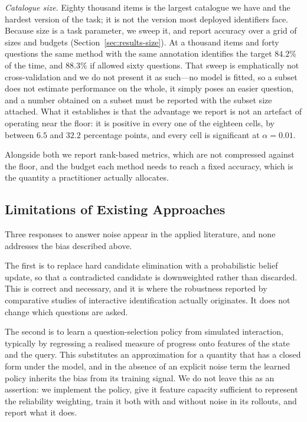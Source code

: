 \emph{Catalogue size.} Eighty thousand items is the largest catalogue we have
and the hardest version of the task; it is not the version most deployed
identifiers face. Because size is a task parameter, we sweep it, and report
accuracy over a grid of sizes and budgets
(Section~\ref{sec:results-size}). At a thousand items and forty questions the
same method with the same annotation identifies the target $84.2\%$ of the
time, and $88.3\%$ if allowed sixty questions. That sweep is emphatically not
cross-validation and we do not present it as such---no model is fitted, so a
subset does not estimate performance on the whole, it simply poses an easier
question, and a number obtained on a subset must be reported with the subset
size attached. What it establishes is that the advantage we report is not an
artefact of operating near the floor: it is positive in every one of the
eighteen cells, by between $6.5$ and $32.2$ percentage points, and every cell
is significant at $\alpha = 0.01$.

Alongside both we report rank-based metrics, which are not compressed against
the floor, and the budget each method needs to reach a fixed accuracy, which is
the quantity a practitioner actually allocates.

\subsection{Limitations of Existing Approaches}

Three responses to answer noise appear in the applied literature, and none
addresses the bias described above.

The first is to replace hard candidate elimination with a probabilistic belief
update, so that a contradicted candidate is downweighted rather than
discarded. This is correct and necessary, and it is where the robustness
reported by comparative studies of interactive identification actually
originates. It does not change which questions are asked.

The second is to learn a question-selection policy from simulated
interaction, typically by regressing a realised measure of progress onto
features of the state and the query. This substitutes an approximation for a
quantity that has a closed form under the model, and in the absence of an
explicit noise term the learned policy inherits the bias from its training
signal. We do not leave this as an assertion: we implement the policy, give
it feature capacity sufficient to represent the reliability weighting, train
it both with and without noise in its rollouts, and report what it does.

